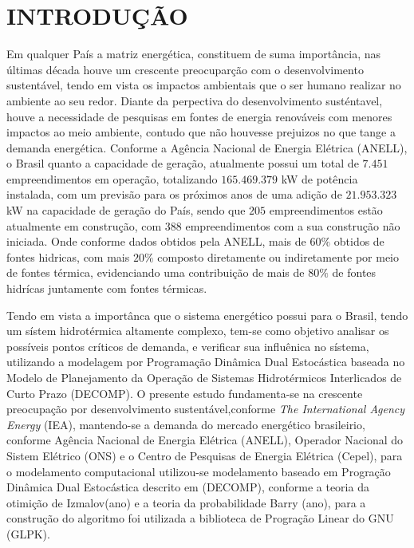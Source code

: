 \documentclass[12pt,fleqn]{article}
\begin{document}
\section{INTRODU\c C\~AO}
Em qualquer Pa\'is a matriz energ\'etica, constituem de suma import\^ancia, nas \'ultimas d\'ecada houve um crescente
preocupar\c c\~ao com o desenvolvimento sustent\'avel, tendo em vista os impactos ambientais que o ser humano realizar
no ambiente ao seu redor. Diante da perpectiva do desenvolvimento sust\'entavel, houve a necessidade de pesquisas em
fontes de energia renov\'aveis com menores impactos ao meio ambiente, contudo que n\~ao houvesse prejuizos
no que tange a demanda energ\'etica. Conforme a Ag\^encia Nacional de Energia El\'etrica (ANELL), o Brasil quanto a
capacidade de gera\c c\~ao, atualmente possui um total de $7.451$ empreendimentos em opera\c c\~ao, totalizando
$165.469.379$ kW de pot\^encia instalada, com um previs\~ao para os pr\'oximos anos de uma adi\c c\~ao de $21.953.323$
kW na capacidade de gera\c c\~ao do Pa\'is, sendo que $205$ empreendimentos est\~ao atualmente em constru\c c\~ao, com
$388$ empreendimentos com a sua constru\c c\~ao n\~ao iniciada. Onde conforme dados obtidos pela ANELL, mais de
$60\%$ obtidos de fontes hidricas, com mais $20\%$ composto diretamente ou indiretamente por meio de fontes t\'ermica,
evidenciando uma contribui\c c\~ao de mais de $80\%$ de fontes hidr\'icas juntamente com fontes t\'ermicas.

Tendo em vista a import\^anca que o sistema energ\'etico possui para o Brasil, tendo um s\'istem hidrot\'ermica
altamente complexo, tem-se como objetivo analisar os poss\'iveis pontos cr\'iticos de demanda, e verificar sua
influ\^enica no s\'istema, utilizando a modelagem por Programa\c c\~ao Din\^amica Dual Estoc\'astica baseada no Modelo de
Planejamento da Opera\c c\~ao de Sistemas Hidrot\'ermicos Interlicados de Curto Prazo (DECOMP). O presente estudo
fundamenta-se na crescente preocupa\c c\~ao por desenvolvimento sustent\'avel,conforme \textit{The International Agency Energy}
(IEA), mantendo-se a demanda do mercado energ\'etico brasileirio, conforme Ag\^encia Nacional de Energia El\'etrica
(ANELL), Operador Nacional do Sistem  El\'etrico (ONS) e o Centro de Pesquisas de Energia El\'etrica (Cepel), para o
modelamento computacional utilizou-se modelamento baseado em Progra\c c\~ao Din\^amica Dual Estoc\'astica descrito em
(DECOMP), conforme a teoria da otimi\c c\~ao de Izmalov(ano) e a teoria da probabilidade Barry (ano), para a constru\c
c\~ao do algoritmo foi utilizada a biblioteca de Progra\c c\~ao Linear do GNU (GLPK).
\end{document}
